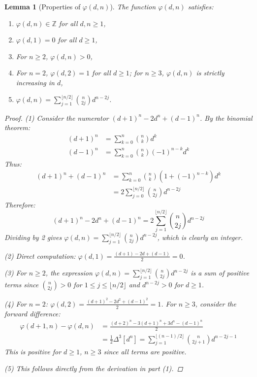 \documentclass[11pt]{article}
\newtheorem{lemma}[definition]{Lemma}
\begin{document}
\begin{lemma}[Properties of $\varphi(d,n)$]\label{lem:phi-properties}
The function $\varphi(d,n)$ satisfies:
\begin{enumerate}
    \item $\varphi(d,n) \in \mathbb{Z}$ for all $d,n \geq 1$,
    \item $\varphi(d,1) = 0$ for all $d \geq 1$,
    \item For $n \geq 2$, $\varphi(d,n) > 0$,
    \item For $n = 2$, $\varphi(d,2) = 1$ for all $d \geq 1$; for $n \geq 3$, $\varphi(d,n)$ is strictly increasing in $d$,
    \item $\varphi(d,n) = \sum_{j=1}^{\lfloor n/2 \rfloor} \binom{n}{2j} d^{n-2j}$.
\end{enumerate}
\begin{proof}
(1) Consider the numerator $(d+1)^n - 2d^n + (d-1)^n$. By the binomial theorem:
\begin{align*}
(d+1)^n &= \sum_{k=0}^n \binom{n}{k} d^k \\
(d-1)^n &= \sum_{k=0}^n \binom{n}{k} (-1)^{n-k} d^k
\end{align*}
Thus:
\begin{align*}
(d+1)^n + (d-1)^n &= \sum_{k=0}^n \binom{n}{k} (1 + (-1)^{n-k}) d^k \\
&= 2\sum_{j=0}^{\lfloor n/2 \rfloor} \binom{n}{2j} d^{n-2j}
\end{align*}
Therefore:
\[
(d+1)^n - 2d^n + (d-1)^n = 2\sum_{j=1}^{\lfloor n/2 \rfloor} \binom{n}{2j} d^{n-2j}
\]
Dividing by 2 gives $\varphi(d,n) = \sum_{j=1}^{\lfloor n/2 \rfloor} \binom{n}{2j} d^{n-2j}$, which is clearly an integer.

(2) Direct computation: $\varphi(d,1) = \frac{(d+1) - 2d + (d-1)}{2} = 0$.

(3) For $n \geq 2$, the expression $\varphi(d,n) = \sum_{j=1}^{\lfloor n/2 \rfloor} \binom{n}{2j} d^{n-2j}$ is a sum of positive terms since $\binom{n}{2j} > 0$ for $1 \leq j \leq \lfloor n/2 \rfloor$ and $d^{n-2j} > 0$ for $d \geq 1$.

(4) For $n=2$: $\varphi(d,2) = \frac{(d+1)^2 - 2d^2 + (d-1)^2}{2} = 1$. For $n \geq 3$, consider the forward difference:
\begin{align*}
\varphi(d+1,n) - \varphi(d,n) &= \frac{(d+2)^n - 3(d+1)^n + 3d^n - (d-1)^n}{2} \\
&= \frac{1}{2}\Delta^3[d^n] = \sum_{j=1}^{\lfloor (n-1)/2 \rfloor} \binom{n}{2j+1} d^{n-2j-1}
\end{align*}
This is positive for $d \geq 1$, $n \geq 3$ since all terms are positive.

(5) This follows directly from the derivation in part (1).
\end{proof}
\end{lemma}
\end{document}
